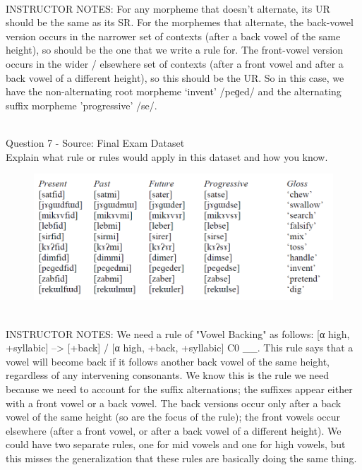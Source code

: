 \documentclass[12pt]{article}
\begin{document}
~\\
INSTRUCTOR NOTES: For any morpheme that doesn’t alternate, its UR should be the same as its SR.  For the morphemes that alternate, the back-vowel version occurs in the narrower set of contexts (after a back vowel of the same height), so should be the one that we write a rule for. The front-vowel version occurs in the wider / elsewhere set of contexts (after a front vowel and after a back vowel of a different height), so this should be the UR. So in this case, we have the non-alternating root morpheme ‘invent’ /peɡed/ and the alternating suffix morpheme 'progressive' /se/.


~\\

{\large Question 7} - Source: Final Exam Dataset\\

Explain what rule or rules would apply in this dataset and how you know.\\

\begin{figure}[H]
\includegraphics{../images/final_dataset.png}
\end{figure}

~\\
INSTRUCTOR NOTES: We need a rule of "Vowel Backing" as follows: [α high, +syllabic] --> [+back] / [α high, +back, +syllabic] C0 \_\_. This rule says that a vowel will become back if it follows another back vowel of the same height, regardless of any intervening consonants. We know this is the rule we need because we need to account for the suffix alternations; the suffixes appear either with a front vowel or a back vowel. The back versions occur only after a back vowel of the same height (so are the focus of the rule); the front vowels occur elsewhere (after a front vowel, or after a back vowel of a different height). We could have two separate rules, one for mid vowels and one for high vowels, but this misses the generalization that these rules are basically doing the same thing.
\end{document}
